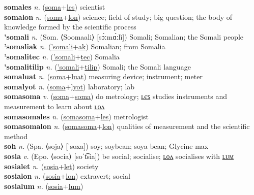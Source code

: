 \textbf{somales} \textit{n.} (\hyperref[soma]{soma}+\hyperref[les]{les})
scientist \label{somales} \\
\textbf{somalon} \textit{n.} (\hyperref[soma]{soma}+\hyperref[lon]{lon})
science; field of study; big question; the body of knowledge formed by the scientific process \label{somalon} \\
\textbf{'somali} \textit{n.} (Som. ⟨Soomaali⟩ [sɔ̀ːmɑ́ːlì])
Somali; Somalian; the Somali people \label{'somali} \\
\textbf{'somaliak} \textit{n.} (\hyperref['somali]{'somali}+\hyperref[ak]{ak})
Somalian; from Somalia \label{'somaliak} \\
\textbf{'somalitec} \textit{n.} (\hyperref['somali]{'somali}+\hyperref[tec]{tec})
Somalia \label{'somalitec} \\
\textbf{'somalitilip} \textit{n.} (\hyperref['somali]{'somali}+\hyperref[tilip]{tilip})
Somali; the Somali language \label{'somalitilip} \\
\textbf{somaluat} \textit{n.} (\hyperref[soma]{soma}+\hyperref[luat]{luat})
measuring device; instrument; meter \label{somaluat} \\
\textbf{somalyot} \textit{n.} (\hyperref[soma]{soma}+\hyperref[lyot]{lyot})
laboratory; lab \label{somalyot} \\
\textbf{somasoma} \textit{v.} (\hyperref[soma]{soma}+\hyperref[soma]{soma})
do metrology; \hyperref[somasomales]{ʟєꜱ} studies instruments and measurement to learn about \hyperref[somasomalon]{ʟᴏᴧ} \label{somasoma} \\
\textbf{somasomales} \textit{n.} (\hyperref[somasoma]{somasoma}+\hyperref[les]{les})
metrologist \label{somasomales} \\
\textbf{somasomalon} \textit{n.} (\hyperref[somasoma]{somasoma}+\hyperref[lon]{lon})
qualities of measurement and the scientific method \label{somasomalon} \\
\textbf{soh} \textit{n.} (Spa. ⟨soja⟩ [ˈsoxa])
soy; soybean; soya bean; Glycine max \label{soh} \\
\textbf{sosia} \textit{v.} (Epo. ⟨socia⟩ [soˈt͡sia])
be social; socialise; \hyperref[sosialon]{ʟᴏᴧ} socialises with \hyperref[sosialum]{ʟᴜᴍ} \label{sosia} \\
\textbf{sosialet} \textit{n.} (\hyperref[sosia]{sosia}+\hyperref[let]{let})
society \label{sosialet} \\
\textbf{sosialon} \textit{n.} (\hyperref[sosia]{sosia}+\hyperref[lon]{lon})
extravert; social \label{sosialon} \\
\textbf{sosialum} \textit{n.} (\hyperref[sosia]{sosia}+\hyperref[lum]{lum})

